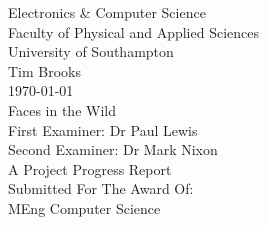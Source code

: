 \documentclass[12pt, a4paper]{article}
\begin{document}
 
 
 
 
       
        \begin{titlepage}
                       
                \center
               
                {\large Electronics \& Computer Science}\\
                {\large Faculty of Physical and Applied Sciences}\\
                {\large University of Southampton}\\[2.5cm]
               
                {\Large Tim Brooks}\\[0.5cm]
                {\Large \today}\\[2.5cm]
               
                {\LARGE Faces in the Wild}\\[3.0cm]
               
                {\large First Examiner: Dr Paul Lewis}\\[0.5cm]
                {\large Second Examiner: Dr Mark Nixon}\\[3.2cm]
               
                {\large A Project Progress Report\\ Submitted For The Award Of:}\\[0.2cm]
                {\Large MEng Computer Science}
               
                \vfill
       
        \end{titlepage}
       
       
       
       
 
        \begin{abstract}
               
        \end{abstract}
       
        \newpage
       
 
 
\end{document}
